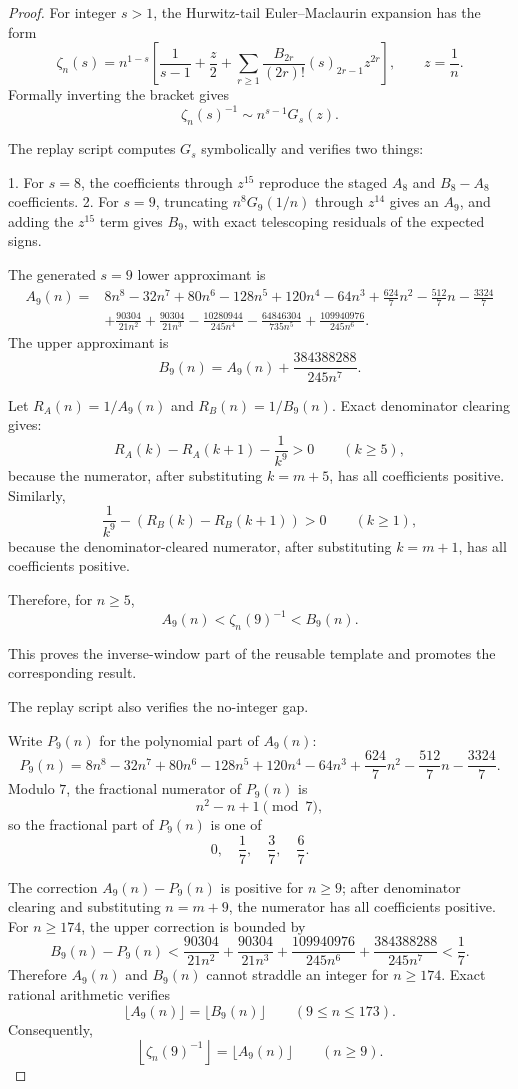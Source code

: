 \begin{proof}
For integer \(s>1\), the Hurwitz-tail Euler--Maclaurin expansion has the form
\[
\zeta_n(s)
=n^{1-s}\left[
\frac1{s-1}+\frac{z}{2}
+\sum_{r\ge1}\frac{B_{2r}}{(2r)!}(s)_{2r-1}z^{2r}
\right],
\qquad z=\frac1n.
\]
Formally inverting the bracket gives
\[
\zeta_n(s)^{-1}\sim n^{s-1}G_s(z).
\]

The replay script
computes \(G_s\) symbolically and verifies two things:

1. For \(s=8\), the coefficients through \(z^{15}\) reproduce the staged \(A_8\) and \(B_8-A_8\) coefficients.
2. For \(s=9\), truncating \(n^8G_9(1/n)\) through \(z^{14}\) gives an \(A_9\), and adding the \(z^{15}\) term gives \(B_9\), with exact telescoping residuals of the expected signs.

The generated \(s=9\) lower approximant is
\[
\begin{aligned}
A_9(n)=&8n^8-32n^7+80n^6-128n^5+120n^4-64n^3
+\frac{624}{7}n^2-\frac{512}{7}n-\frac{3324}{7}\\
&+\frac{90304}{21n^2}+\frac{90304}{21n^3}
-\frac{10280944}{245n^4}-\frac{64846304}{735n^5}
+\frac{109940976}{245n^6}.
\end{aligned}
\]
The upper approximant is
\[
B_9(n)=A_9(n)+\frac{384388288}{245n^7}.
\]

Let \(R_A(n)=1/A_9(n)\) and \(R_B(n)=1/B_9(n)\). Exact denominator clearing gives:
\[
R_A(k)-R_A(k+1)-\frac1{k^9}>0
\qquad(k\ge5),
\]
because the numerator, after substituting \(k=m+5\), has all coefficients positive. Similarly,
\[
\frac1{k^9}-\left(R_B(k)-R_B(k+1)\right)>0
\qquad(k\ge1),
\]
because the denominator-cleared numerator, after substituting \(k=m+1\), has all coefficients positive.

Therefore, for \(n\ge5\),
\[
A_9(n)<\zeta_n(9)^{-1}<B_9(n).
\]

This proves the inverse-window part of the reusable template and promotes the corresponding result.

The replay script also verifies the no-integer gap.

Write \(P_9(n)\) for the polynomial part of \(A_9(n)\):
\[
P_9(n)=8n^8-32n^7+80n^6-128n^5+120n^4-64n^3
+\frac{624}{7}n^2-\frac{512}{7}n-\frac{3324}{7}.
\]
Modulo \(7\), the fractional numerator of \(P_9(n)\) is
\[
n^2-n+1\pmod 7,
\]
so the fractional part of \(P_9(n)\) is one of
\[
0,\quad \frac17,\quad \frac37,\quad \frac67.
\]

The correction \(A_9(n)-P_9(n)\) is positive for \(n\ge9\); after denominator clearing and substituting \(n=m+9\), the numerator has all coefficients positive. For \(n\ge174\), the upper correction is bounded by
\[
B_9(n)-P_9(n)
<
\frac{90304}{21n^2}
+\frac{90304}{21n^3}
+\frac{109940976}{245n^6}
+\frac{384388288}{245n^7}
<\frac17.
\]
Therefore \(A_9(n)\) and \(B_9(n)\) cannot straddle an integer for \(n\ge174\). Exact rational arithmetic verifies
\[
\lfloor A_9(n)\rfloor=\lfloor B_9(n)\rfloor
\qquad(9\le n\le173).
\]
Consequently,
\[
\left\lfloor\zeta_n(9)^{-1}\right\rfloor=\lfloor A_9(n)\rfloor
\qquad(n\ge9).
\]


\end{proof}
